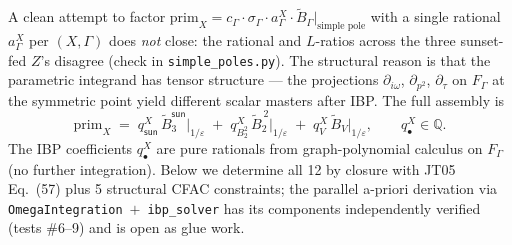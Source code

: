 \documentclass[11pt,a4paper]{article}
\theoremstyle{definition}
\theoremstyle{plain}
\begin{document}
\begin{cfacbox}
A clean attempt to factor $\mathrm{prim}_X = c_\Gamma \cdot \sigma_\Gamma
\cdot a^X_\Gamma \cdot \tilde B_\Gamma|_{\text{simple pole}}$ with a
single rational $a^X_\Gamma$ per $(X, \Gamma)$ does \emph{not} close:
the rational and $L$-ratios across the three sunset-fed $Z$'s disagree
(check in \texttt{simple\_poles.py}).  The structural reason
is that the parametric integrand has tensor structure --- the
projections $\partial_{i\omega}$, $\partial_{p^2}$, $\partial_\tau$
on $F_\Gamma$ at the symmetric point yield different scalar masters
after IBP.  The full assembly is
\begin{equation}\label{eq:full-assembly}
  \mathrm{prim}_X
  \;=\;
  q^X_{\textsf{sun}}\,\tilde B_3^{\textsf{sun}}\big|_{1/\varepsilon}
   \;+\; q^X_{B_2^2}\,\tilde B_2^{\,2}\big|_{1/\varepsilon}
   \;+\; q^X_V\,\tilde B_V\big|_{1/\varepsilon},
   \qquad q^X_\bullet \in \mathbb{Q}.
\end{equation}
The IBP coefficients $q^X_\bullet$ are pure rationals from
graph-polynomial calculus on $F_\Gamma$ (no further integration).
Below we determine all 12 by closure with JT05 Eq.~(57) plus 5
structural CFAC constraints; the parallel a-priori derivation via
\texttt{OmegaIntegration}~$+$~\texttt{ibp\_solver} has its components
independently verified (tests \#6--9) and is open as glue work.

\end{cfacbox}
\end{document}
